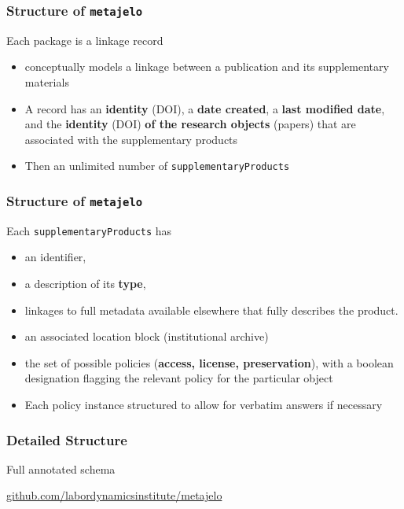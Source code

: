 \begin{frame}
\frametitle{Structure of \texttt{metajelo}}
\begin{block}{Each package is a linkage record}
	\begin{itemize}
		\item  conceptually models a linkage between a publication and its supplementary materials
		\item A record has an \textbf{identity} (\ac{DOI}), a \textbf{date created}, a \textbf{last modified date}, and the \textbf{identity} (\ac{DOI}) \textbf{of the research objects} (papers) that are associated with the supplementary products
		\item Then an unlimited number of \texttt{supplementaryProducts}
	\end{itemize}
\end{block}
\end{frame}
		
\begin{frame}
\frametitle{Structure of \texttt{metajelo}}
\begin{block}{Each \texttt{supplementaryProducts} has}
	\begin{itemize}
	\item  an identifier, 
	\item a description of its \textbf{type}, 
	\item linkages to full metadata available elsewhere that fully describes the product.  
	\item an associated location block (institutional archive)
	\item the set of possible policies (\textbf{access, license, preservation}), with a boolean designation flagging the relevant policy for the particular object
	\item Each policy instance structured to allow for verbatim answers if necessary
\end{itemize}
\end{block}
\end{frame}



\begin{frame}
\frametitle{Detailed Structure}
\begin{block}{Full annotated schema}
	
\href{https://github.com/labordynamicsinstitute/metajelo}{github.com/labordynamicsinstitute/metajelo}
\end{block}
\end{frame}



